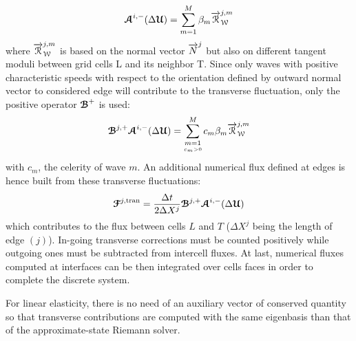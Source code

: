 \begin{equation}
{\boldsymbol{\mathcal{A}}}^{i,-}(\Delta {\boldsymbol{\mathcal{U}}}) = \sum_{m=1}^{M} \beta_m {\overrightarrow{\mathcal{R}}}^{j,m}_{\mathcal{W}}
\end{equation}
where ${\overrightarrow{\mathcal{R}}}_{\mathcal{W}}^{j,m}$ is based on the normal vector ${\overrightarrow{N}}^j$ but also on different tangent moduli between grid cells L and its neighbor T. Since only waves with positive characteristic speeds with respect to the orientation defined by outward normal vector to considered edge will contribute to the transverse fluctuation, only the positive operator ${\boldsymbol{\mathcal{B}}}^+$ is used:
\begin{equation}
{\boldsymbol{\mathcal{B}}}^{j,+} {\boldsymbol{\mathcal{A}}}^{i,-}(\Delta {\boldsymbol{\mathcal{U}}}) = \sum_{\underset{c_m >0}{m=1}}^{M} c_m \beta_m {\overrightarrow{\mathcal{R}}}_{\mathcal{W}}^{j,m} \label{eq:transverse_fluctuations}
\end{equation}
with $c_m$, the celerity of wave $m$.
An additional numerical flux defined at edges is hence built from these transverse fluctuations:
\begin{equation}
{\boldsymbol{\mathcal{F}}}^{j,\text{tran}} = \frac{\Delta t}{2 \Delta X^j} {\boldsymbol{\mathcal{B}}}^{j,+} {\boldsymbol{\mathcal{A}}}^{i,-}(\Delta {\boldsymbol{\mathcal{U}}}) \label{eq:transverse_corrections}
\end{equation}
which contributes to the flux between cells $L$ and $T$ ($\Delta X^j$ being the length of edge $(j)$). 
In-going transverse corrections must be counted positively while outgoing ones must be subtracted from intercell fluxes. At last, numerical fluxes computed at interfaces can be then integrated over cells faces in order to complete the discrete system.%

 
\begin{remark} 
  For linear elasticity, there is no need of an auxiliary vector of conserved quantity so that transverse contributions are computed with the same eigenbasis than that of the approximate-state Riemann solver.
\end{remark}

